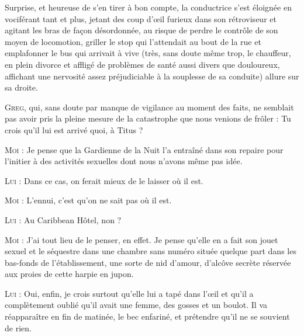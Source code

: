 Surprise, et heureuse de s’en tirer à bon compte, la conductrice s’est éloignée en vociférant tant et plus, jetant des coup d’œil furieux dans son rétroviseur et agitant les bras de façon désordonnée, au risque de perdre le contrôle de son moyen de locomotion, griller le stop qui l’attendait au bout de la rue et emplafonner le bus qui arrivait à vive (très, sans doute même trop, le chauffeur, en plein divorce et affligé de problèmes de santé aussi divers que douloureux, affichant une nervosité assez préjudiciable à la souplesse de sa conduite) allure sur sa droite.

\begin{dialogue}

\textsc{Greg}, qui, sans doute par manque de vigilance au moment des faits, ne semblait pas avoir pris la pleine mesure de la catastrophe que nous venions de frôler : Tu crois qu’il lui est arrivé quoi, à Titus ?

\textsc{Moi} : Je pense que la Gardienne de la Nuit l’a entraîné dans son repaire pour l’initier à des activités sexuelles dont nous n’avons même pas idée.

\textsc{Lui} : Dans ce cas, on ferait mieux de le laisser où il est.

\textsc{Moi} : L’ennui, c’est qu’on ne sait pas où il est.

\textsc{Lui} : Au Caribbean Hôtel, non ?

%
%
%
\textsc{Moi} : J’ai tout lieu de le penser, en effet. Je pense qu’elle en a fait son jouet sexuel et le séquestre dans une chambre sans numéro située quelque part dans les bas-fonds de l’établissement, une sorte de nid d’amour, d’alcôve secrète réservée aux proies de cette harpie en jupon.

\textsc{Lui} : Oui, enfin, je crois surtout qu’elle lui a tapé dans l’œil et qu’il a complètement oublié qu’il avait une femme, des gosses et un boulot. Il va réapparaître en fin de matinée, le bec enfariné, et prétendre qu’il ne se souvient de rien.


\end{dialogue}
